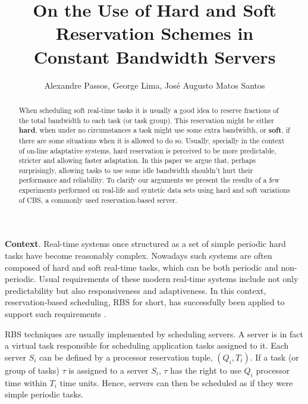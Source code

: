 \documentclass[times, 10pt,twocolumn]{article}
\author{Alexandre Passos, George Lima, Jos\'e Augusto Matos Santos}
\title{On the Use of Hard and Soft Reservation Schemes in \\ Constant Bandwidth Servers}
\begin{document}
\graphicspath{{figs/}{data/}}

\maketitle

\begin{abstract}

  When scheduling soft real-time tasks it is usually a good idea to
  reserve fractions of the total bandwidth to each task (or task
  group). This reservation might be either \textbf{hard}, when under
  no circumstances a task might use some extra bandwidth, or
  \textbf{soft}, if there are some situations when it is allowed to do
  so. Usually, specially in the context of on-line adaptative systems,
  hard reservation is perceived to be more predictable, stricter and
  allowing faster adaptation. In this paper we argue that, perhaps
  surprisingly, allowing tasks to use some idle bandwidth shouldn't
  hurt their performance and reliability. To clarify our arguments we
  present the results of a few experiments performed on real-life and
  syntetic data sets using hard and soft variations of CBS, a commonly
  used reservation-based server.
  
\end{abstract}

\label{sec:introduction}

\textbf{Context}.  Real-time systems once structured as a set of
simple periodic hard tasks \cite{liu.ea73:scheduling} have become
reasonably complex. Nowadays such systems are often composed of hard
and soft real-time tasks, which can be both periodic and non-periodic.
Usual requirements of these modern real-time systems include not only
predictability but also responsiveness and adaptiveness. In this
context, reservation-based scheduling, RBS for short, has successfully
been applied to support such requirements
\cite{abeni.ea04:resource,mercer.ea94:processor,RJMO98,SSL89,SFLB03}.

RBS techniques are usually implemented by scheduling servers. A server
is in fact a virtual task responsible for scheduling application tasks
assigned to it.  Each server $S_i$ can be defined by a processor
reservation tuple, $(Q_i,T_i)$.  If a task (or group of tasks) $\tau$
is assigned to a server $S_i$, $\tau$ has the right to use $Q_i$
processor time within $T_i$ time units. Hence, servers can then be
scheduled as if they were simple periodic tasks.
\end{document}
